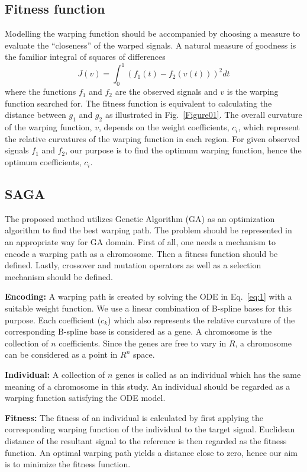 \documentclass[number,1p,12pt]{elsarticle}
\begin{document}
\subsection{Fitness function}
Modelling the warping function should be accompanied by choosing a measure to evaluate the ``closeness'' of the warped signals. A natural measure of goodness is the familiar integral of squares of differences
\begin{equation}
J(v) = \int_0^1 \left(f_1(t)-f_2(v(t))\right)^2 dt
 \label{eq:6}
\end{equation}
where the functions $f_1$ and $f_2$ are the observed signals and $v$ is the warping function searched for. The fitness function is equivalent to calculating the distance between $g_1$ and $g_2$ as illustrated in Fig.~\ref{Figure01}. The overall curvature of the warping function, $v$, depends on the weight coefficients, $c_i$, which represent the relative curvatures of the warping function in each region. For given observed signals $f_1$ and $f_2$, our purpose is to find the optimum warping function, hence the optimum coefficients, $c_i$. 

\subsection{SAGA}
The proposed method utilizes Genetic Algorithm (GA) as an optimization algorithm to find the best warping path. The problem should be represented in an appropriate way for GA domain. First of all, one needs a mechanism to encode a warping path as a chromosome. Then a fitness function should be defined. Lastly, crossover and mutation operators as well as a selection mechanism should be defined. 

{\bf Encoding:} A warping path is created by solving the ODE in Eq.~\ref{eq:1} with a suitable  weight function. We use a linear combination of B-spline bases for this purpose. Each coefficient ($c_k$) which also represents the relative curvature of the corresponding B-spline base is considered as a gene. A chromosome is the collection of $n$ coefficients. Since the genes are free to vary in $R$, a chromosome can be considered as a point in $R^n$ space. 

{\bf Individual:} A collection of $n$ genes is called as an individual which has the same meaning of a chromosome in this study. An individual should be regarded as a warping function satisfying the ODE model. 

{\bf Fitness:} The fitness of an individual is calculated by first applying the corresponding warping function of the individual to the target signal. Euclidean distance of the resultant signal to the reference is then regarded as the fitness function. An optimal warping path yields a distance close to zero, hence our aim is to minimize the fitness function. 
\end{document}
